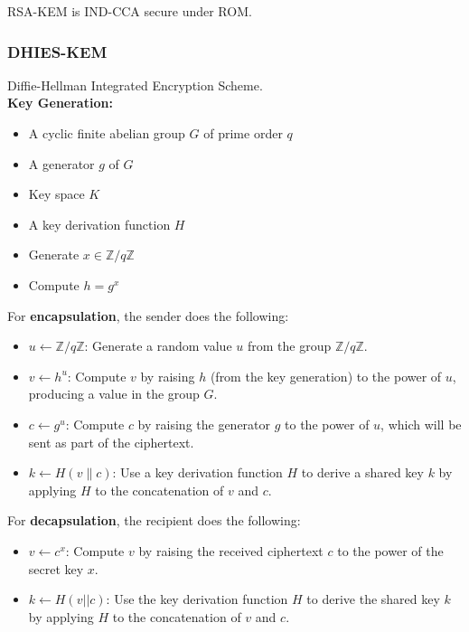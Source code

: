 RSA-KEM is IND-CCA secure under ROM.

\subsubsection{DHIES-KEM}
Diffie-Hellman Integrated Encryption Scheme. \\

\textbf{Key Generation:}
\begin{itemize}
    \item A cyclic finite abelian group $G$ of prime order $q$
    \item A generator $g$ of $G$
    \item Key space $K$
    \item A key derivation function $H$
    \item Generate $x \in \mathbb{Z}/q\mathbb{Z}$
    \item Compute $h = g^x$
\end{itemize}

For \textbf{encapsulation}, the sender does the following:
\begin{itemize}
    \item \( u \leftarrow \mathbb{Z}/q\mathbb{Z} \): Generate a random value \( u \) from the group \( \mathbb{Z}/q\mathbb{Z} \).
    \item \( v \leftarrow h^u \): Compute \( v \) by raising \( h \) (from the key generation) to the power of \( u \), producing a value in the group \( G \).
    \item \( c \leftarrow g^u \): Compute \( c \) by raising the generator \( g \) to the power of \( u \), which will be sent as part of the ciphertext.
    \item \( k \leftarrow H(v \parallel c) \): Use a key derivation function \( H \) to derive a shared key \( k \) by applying \( H \) to the concatenation of \( v \) and \( c \).
\end{itemize}

For \textbf{decapsulation}, the recipient does the following:
\begin{itemize}
    \item \( v \leftarrow c^x \): Compute \( v \) by raising the received ciphertext \( c \) to the power of the secret key \( x \).
    \item \( k \leftarrow H(v || c) \): Use the key derivation function \( H \) to derive the shared key \( k \) by applying \( H \) to the concatenation of \( v \) and \( c \).
\end{itemize}

